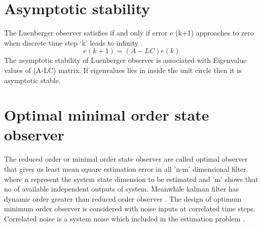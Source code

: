 \documentclass[12pt,a4paper]{article}
\begin{document}
\section*{Asymptotic stability}
The Luenberger observer satisfies if and only if error e (k+1) approaches to zero when discrete time step ‘k’ leads to infinity  \cite{pasand2019luenberger}.\\
\begin{equation}
e(k+1)= (A-LC)e(k)
\end{equation}
The asymptotic stability of Luenberger observer is associated with Eigenvalue values of (A-LC) matrix. If eigenvalues lies in inside the unit circle then it is asymptotic stable.
\section*{Optimal minimal order state observer}
The reduced order or minimal order state observer are called optimal observer that gives us least mean square estimation error in all 'n-m' dimensional filter. where n represent the system state dimension to be estimated and 'm' shows that no of available independent outputs of system. Meanwhile kalman filter has dynamic order greater than reduced order observer \cite{pasand2019luenberger}\cite{gautheir1992simple}.
The design of optimum minimum order observer is considered with noise inputs at correlated time steps. Correlated noise is a system noise which included in the estimation problem
\cite{ciccarella199310}.
\end{document}
